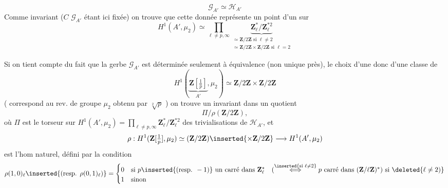 \[
\mathcal G_{A'}\simeq\mathcal H_{A'}
\]
Comme invariant ($C$  $\mathcal G_{A'}$  étant ici fixée) on trouve que cette donnée  représente un point d'un  sur
\[
H^1(A',\mu_2)\simeq\prod_{\ell\ne p,\infty}\underbrace{\mathbf Z_\ell^*/\mathbf Z_\ell^{*2}}_{\begin{gathered}\simeq\mathbf Z/2\mathbf Z\text{ si }\ell\ne2\\\simeq\mathbf Z/2\mathbf Z\times\mathbf Z/2\mathbf Z\text{ si }\ell=2\end{gathered}}
\]

Si on tient compte du fait que la gerbe $\mathcal G_{A'}$ est déterminée seulement à équivalence (non unique près), le choix d'une   donc d'une classe de
\[
H^1(\underbrace{\mathbf Z[\tfrac1p]}_{A'},\mu_2)\simeq\mathbf Z/2\mathbf Z\times\mathbf Z/2\mathbf Z
\]
(   correspond au rev. de groupe $\mu_2$ obtenu par $\sqrt[2]{p}$ ) on trouve un invariant  dans un quotient
\[
\Pi/\rho(\mathbf Z/2\mathbf Z),
\]
où $\Pi$ est le torseur sur $H^1(A',\mu_2)=\prod_{\ell\ne p,\infty}\mathbf Z_\ell^*/\mathbf Z_\ell^{*2}$ des trivialisations de $\mathcal H_{A'}$, et
\[
\rho:H^1(\mathbf Z[\tfrac1p],\mu_2)\simeq(\mathbf Z/2\mathbf Z)\inserted{\times\mathbf Z/2\mathbf Z}\longrightarrow H^1(A',\mu_2)
\]
est l'hom naturel, défini par la condition
\[
\rho(1,0)_\ell\inserted{\text{(resp. }\rho(0,1)_\ell\text{)}}=
\begin{cases}
0&\text{si }p\inserted{\text{(resp. }-1\text{)}}\text{ un carré dans }\mathbf Z_\ell^*\quad(\overset{\inserted{\text{si }\ell\ne2}}{\Longleftrightarrow}p\text{ carré dans }(\mathbf Z/\ell\mathbf Z)^*\text{) si }\deleted{\ell\ne2)}\\
1&\text{sinon}
\end{cases}
\]

